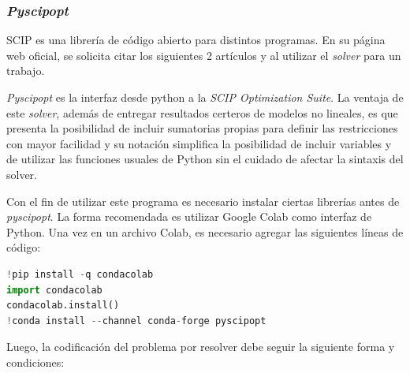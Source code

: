 \subsubsection{\textit{Pyscipopt}}

SCIP es una librería de código abierto para distintos programas. En su página web oficial, se solicita citar los siguientes 2 artículos 
y  al utilizar el \textit{solver} para un trabajo. 
\vspace{2.5mm}

\textit{Pyscipopt} es la interfaz desde python a la \textit{SCIP Optimization Suite}. La ventaja de este \textit{solver}, además de entregar resultados certeros de modelos no lineales, es que presenta la posibilidad de incluir sumatorias propias para definir las restricciones con mayor facilidad y su notación simplifica la posibilidad de incluir variables y de utilizar las funciones usuales de Python sin el cuidado de afectar la sintaxis del solver.
\vspace{2.5mm}

Con el fin de utilizar este programa es necesario instalar ciertas librerías antes de \textit{pyscipopt}. La forma recomendada es utilizar Google Colab como interfaz de Python. Una vez en un archivo Colab, es necesario agregar las siguientes líneas de código:

\begin{footnotesize}
\begin{lstlisting}[language=Python]
!pip install -q condacolab
import condacolab            
condacolab.install()
!conda install --channel conda-forge pyscipopt
\end{lstlisting}
\end{footnotesize}

 
Luego, la codificación del problema por resolver debe seguir la siguiente forma y condiciones:

